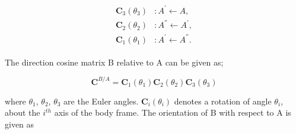 \begin{align}
\label{eqn:sequence}
\begin{split}
{\bm{C}}_3(\theta_{3}) & :      A^{'} \leftarrow A   ,
\\
{\bm{C}}_2(\theta_{2}) & :      A^{''} \leftarrow A^{'}   ,
\\
{\bm{C}}_1(\theta_{1}) & :      A^{'} \leftarrow A^{''}  .
\end{split}
\end{align}

The direction cosine matrix B relative to A can be given as;

\begin{equation}
\label{eqn:sequentialOrientation}
\bm{C}^{B/A}= \bm{C}_{1}(\theta_{1}) \bm{C}_{2}(\theta_{2}) \bm{C}_{3}(\theta_{3})
\end{equation}

where $\theta_{1}$, $\theta_{2}$, $\theta_{3}$ are the Euler angles. $\bm{C}_{i}(\theta_{i})$  
denotes a rotation of angle $\theta_{i}$, about the $i^{th}$ axis of the body frame. The orientation of B with respect to A is given as


